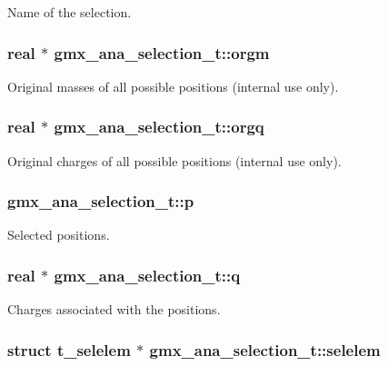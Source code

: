 \-Name of the selection. \hypertarget{structgmx__ana__selection__t_a16054b99f1ace8cc67e7edb83f4fe9d2}{
\subsubsection[{orgm}]{\setlength{\rightskip}{0pt plus 5cm}real $\ast$ {\bf gmx\-\_\-ana\-\_\-selection\-\_\-t\-::orgm}}}\label{structgmx__ana__selection__t_a16054b99f1ace8cc67e7edb83f4fe9d2}
\-Original masses of all possible positions (internal use only). \hypertarget{structgmx__ana__selection__t_aaa176888e5c42159df882ef4653c0bea}{
\subsubsection[{orgq}]{\setlength{\rightskip}{0pt plus 5cm}real $\ast$ {\bf gmx\-\_\-ana\-\_\-selection\-\_\-t\-::orgq}}}\label{structgmx__ana__selection__t_aaa176888e5c42159df882ef4653c0bea}
\-Original charges of all possible positions (internal use only). \hypertarget{structgmx__ana__selection__t_a47df2484de4409ea55854a73596fd473}{
\subsubsection[{p}]{ {\bf gmx\-\_\-ana\-\_\-selection\-\_\-t\-::p}}}\label{structgmx__ana__selection__t_a47df2484de4409ea55854a73596fd473}
\-Selected positions. \hypertarget{structgmx__ana__selection__t_a064c4869a30cd4a765c4a9e070649997}{
\subsubsection[{q}]{\setlength{\rightskip}{0pt plus 5cm}real $\ast$ {\bf gmx\-\_\-ana\-\_\-selection\-\_\-t\-::q}}}\label{structgmx__ana__selection__t_a064c4869a30cd4a765c4a9e070649997}
\-Charges associated with the positions. \hypertarget{structgmx__ana__selection__t_a267fe62fbf8482460cd1797972fdd5f2}{
\subsubsection[{selelem}]{\setlength{\rightskip}{0pt plus 5cm}struct {\bf t\-\_\-selelem} $\ast$ {\bf gmx\-\_\-ana\-\_\-selection\-\_\-t\-::selelem}}}\label{structgmx__ana__selection__t_a267fe62fbf8482460cd1797972fdd5f2}



